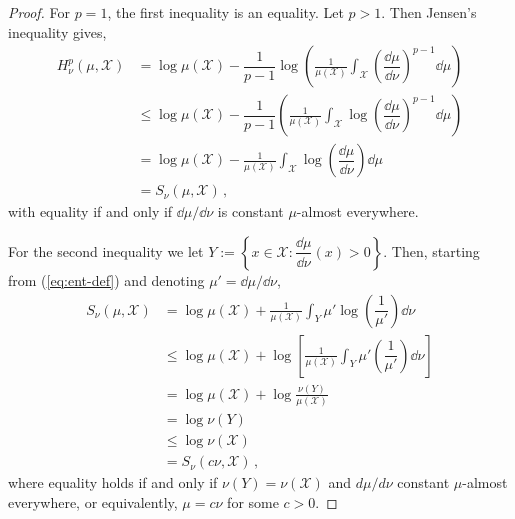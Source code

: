 \documentclass[reqno]{amsart}
\begin{document}
\begin{proof}
For $p=1$, the first inequality is an equality. Let $p>1$.
Then Jensen's inequality gives,
\begin{align*}
H^p_\nu(\mu,\mathcal{X}) 
&=  \log \mu(\mathcal{X}) - \dfrac{1}{p-1 }  \log \left( 
 \frac{1}{\mu({\mathcal{X}})} \int_{{\mathcal{X}}} \left(\dfrac{\dd \mu}{\dd \nu} \right)^{p-1}
 \dd \mu \right)   \\
 &\leq  \log \mu(\mathcal{X}) - \dfrac{1}{p-1 }   \left( 
 \frac{1}{\mu({\mathcal{X}})} \int_{{\mathcal{X}}} \log\left(\dfrac{\dd \mu}{\dd \nu} \right)^{p-1}
 \dd \mu \right)   \\
&=  \log \mu(\mathcal{X}) -  
 \frac{1}{\mu({\mathcal{X}})} \int_{{\mathcal{X}}} \log\left(\dfrac{\dd \mu}{\dd \nu} \right)
 \dd \mu   \\
&= S_\nu(\mu,{\mathcal{X}}) \, ,
\end{align*}
with equality if and only if $\dd \mu / \dd \nu$ is constant $\mu$-almost everywhere.

For the second inequality we let
$Y:=\left\{x \in \mathcal{X}: \dfrac{\dd \mu}{\dd \nu}(x)>0  \right\}$.
Then, starting from (\ref{eq:ent-def}) and denoting $\mu' = \dd\mu/\dd \nu$, 
\begin{align*}
S_\nu(\mu,{\mathcal{X}}) 
 &= \log \mu(\mathcal{X}) 
 + \frac{1}{\mu({\mathcal{X}})} \int_{Y} \mu' 
 \log \left(\dfrac{1}{\mu'} \right)  \dd \nu  \\
&\leq \log \mu(\mathcal{X}) 
 + \log \left[    \frac{1}{\mu({\mathcal{X}})} \int_{Y}    \mu' 
  \left(\dfrac{1}{ \mu'} \right)  \dd \nu   \right] \\
&= \log \mu(\mathcal{X}) 
 + \log   \frac{\nu( Y)}{\mu({\mathcal{X}})} \\
&= \log \nu(Y) \\
&\leq \log \nu({\mathcal{X}})  \\
&=S_\nu(c\nu,{\mathcal{X}}) \, ,
\end{align*}
where equality holds if and only if $\nu(Y)=\nu(\mathcal{X})$ and $d\mu/d\nu$ constant
$\mu$-almost everywhere, or equivalently, $\mu=c\nu$ for some $c>0$.
\end{proof}
\end{document}
